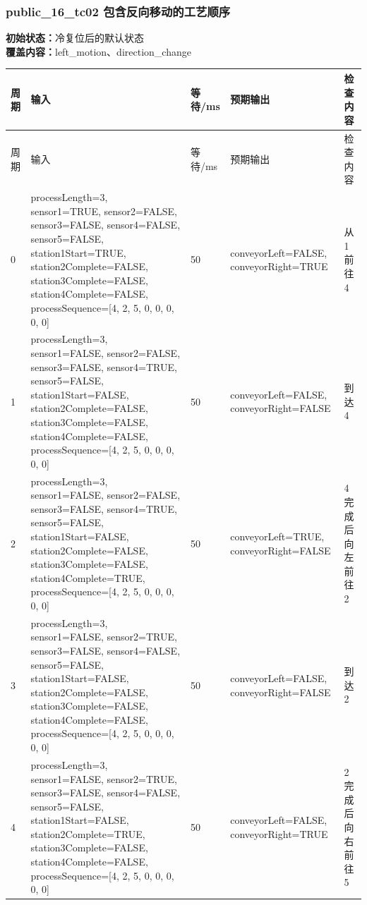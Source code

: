 \subsubsection{{\ttfamily public\_16\_tc02} 包含反向移动的工艺顺序}

\noindent\textbf{初始状态：}冷复位后的默认状态\\

\textbf{覆盖内容：}left\_motion、direction\_change

\begin{longtable}{L{1.0cm}L{4.7cm}L{1.4cm}L{4.0cm}L{2.1cm}}

\toprule

周期 & 输入 & 等待/ms & 预期输出 & 检查内容\\

\midrule

\endfirsthead

\toprule

周期 & 输入 & 等待/ms & 预期输出 & 检查内容\\

\midrule

\endhead

0 & processLength=3, sensor1=TRUE, sensor2=FALSE, sensor3=FALSE, sensor4=FALSE, sensor5=FALSE, station1Start=TRUE, station2Complete=FALSE, station3Complete=FALSE, station4Complete=FALSE, processSequence=[4, 2, 5, 0, 0, 0, 0, 0] & 50 & conveyorLeft=FALSE, conveyorRight=TRUE & 从 1 前往 4\\

1 & processLength=3, sensor1=FALSE, sensor2=FALSE, sensor3=FALSE, sensor4=TRUE, sensor5=FALSE, station1Start=FALSE, station2Complete=FALSE, station3Complete=FALSE, station4Complete=FALSE, processSequence=[4, 2, 5, 0, 0, 0, 0, 0] & 50 & conveyorLeft=FALSE, conveyorRight=FALSE & 到达 4\\

2 & processLength=3, sensor1=FALSE, sensor2=FALSE, sensor3=FALSE, sensor4=TRUE, sensor5=FALSE, station1Start=FALSE, station2Complete=FALSE, station3Complete=FALSE, station4Complete=TRUE, processSequence=[4, 2, 5, 0, 0, 0, 0, 0] & 50 & conveyorLeft=TRUE, conveyorRight=FALSE & 4 完成后向左前往 2\\

3 & processLength=3, sensor1=FALSE, sensor2=TRUE, sensor3=FALSE, sensor4=FALSE, sensor5=FALSE, station1Start=FALSE, station2Complete=FALSE, station3Complete=FALSE, station4Complete=FALSE, processSequence=[4, 2, 5, 0, 0, 0, 0, 0] & 50 & conveyorLeft=FALSE, conveyorRight=FALSE & 到达 2\\

4 & processLength=3, sensor1=FALSE, sensor2=TRUE, sensor3=FALSE, sensor4=FALSE, sensor5=FALSE, station1Start=FALSE, station2Complete=TRUE, station3Complete=FALSE, station4Complete=FALSE, processSequence=[4, 2, 5, 0, 0, 0, 0, 0] & 50 & conveyorLeft=FALSE, conveyorRight=TRUE & 2 完成后向右前往 5\\

\bottomrule

\end{longtable}

